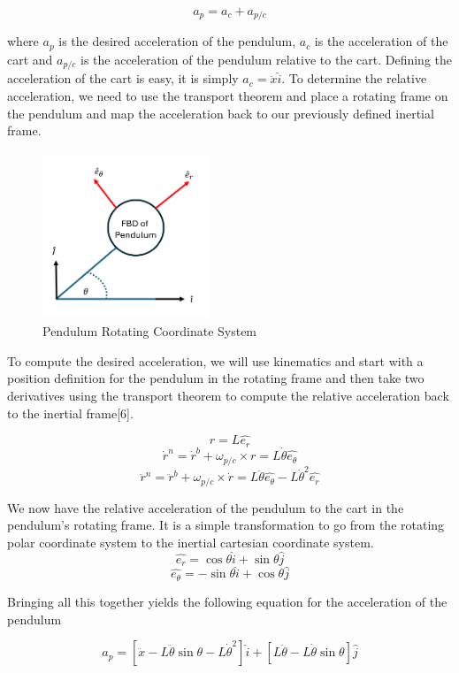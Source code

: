 \documentclass[titlepage]{article}
\begin{document}
\[a_p = a_c + a_{p/c}\]

where \(a_p\) is the desired acceleration of the pendulum, \(a_c\) is the acceleration of the cart and \(a_{p/c}\) is the acceleration of the pendulum relative to the cart. Defining the acceleration of the cart is easy, it is simply \(a_c=\ddot{x}\hat{i}\). To determine the relative acceleration, we need to use the transport theorem and place a rotating frame on the pendulum and map the acceleration back to our previously defined inertial frame.

\begin{figure}[H]
\center
\includegraphics[width=5cm, height=5cm]{rotating_frame.png}
\caption{Pendulum Rotating Coordinate System}
\end{figure}

To compute the desired acceleration, we will use kinematics and start with a position definition for the pendulum in the rotating frame and then take two derivatives using the transport theorem to compute the relative acceleration back to the inertial frame[6].

\[r = L\hat{e_{r}}\]
\[\dot{r}^{n} = \dot{r}^{b} + \omega_{p/c} \times r = L\dot{\theta}\hat{e_{\theta}}\]
\[\ddot{r}^{n} = \ddot{r}^{b} + \omega_{p/c} \times \dot{r} = L\ddot{\theta}\hat{e_{\theta}} - L\dot{\theta}^{2}\hat{e_{r}}\]

We now have the relative acceleration of the pendulum to the cart in the pendulum's rotating frame. It is a simple transformation to go from the rotating polar coordinate system to the inertial cartesian coordinate system.
\[\hat{e_{r}} = \cos{\theta} \hat{i} + \sin{\theta} \hat{j}\]
\[\hat{e_{\theta}} = -\sin{\theta} \hat{i} + \cos{\theta} \hat{j}\]

Bringing all this together yields the following equation for the acceleration of the pendulum

\begin{equation}
a_p = \left[\ddot{x} -L\ddot{\theta}\sin{\theta} - L\dot{\theta}^{2}\right]\hat{i} + \left[L\ddot{\theta} - L\dot{\theta}\sin{\theta}\right]\hat{j}
\end{equation}
\end{document}
